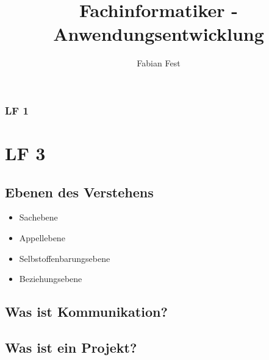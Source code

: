 \documentclass[12pt,a4paper]{book}
\author{Fabian Fest}
\title{Fachinformatiker - Anwendungsentwicklung}
\begin{document}
	\tableofcontents

	
	\section{LF 1}
		
		
	\part*{LF 3}{
		\chapter*{Ebenen des Verstehens}{
			\begin{itemize}
				\item Sachebene 
				\item Appellebene
				\item Selbstoffenbarungsebene
				\item Beziehungsebene
			\end{itemize}	
					
			
			}
		\chapter*{Was ist Kommunikation?}{}
		\chapter*{Was ist ein Projekt?}{}
		}
	
\end{document}
